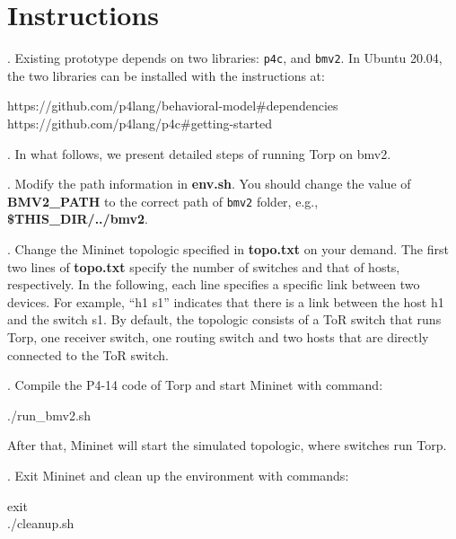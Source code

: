 \section{Instructions}

. Existing prototype depends on two libraries: \texttt{p4c}, and \texttt{bmv2}. In Ubuntu 20.04, the two libraries can be installed with the instructions at:

\begin{center}
https://github.com/p4lang/behavioral-model\#dependencies \\
https://github.com/p4lang/p4c\#getting-started \\
\end{center}

. In what follows, we present detailed steps of running Torp on bmv2.

. Modify the path information in \textbf{env.sh}. You should change the value of \textbf{BMV2\_PATH} to the correct path of \texttt{bmv2} folder, e.g., \textbf{\$THIS\_DIR/../bmv2}.
 
. Change the Mininet topologic specified in \textbf{topo.txt} on your demand. The first two lines of \textbf{topo.txt} specify the number of switches and that of hosts, respectively. In the following, each line specifies a specific link between two devices. For example, ``h1 s1'' indicates that there is a link between the host h1 and the switch s1. By default, the topologic consists of a ToR switch that runs Torp, one receiver switch, one routing switch and two hosts that are directly connected to the ToR switch.
 
. Compile the P4-14 code of Torp and start Mininet with command:

\begin{center}
./run\_bmv2.sh \\
\end{center}

\noindent After that, Mininet will start the simulated topologic, where switches run Torp. 

. Exit Mininet and clean up the environment with commands:

\begin{center}
exit \\
./cleanup.sh \\
\end{center}
